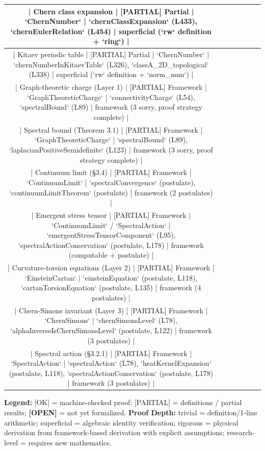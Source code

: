 \documentclass[11pt,a4paper]{article}
\theoremstyle{plain}
\theoremstyle{definition}
\begin{document}
\begin{table}[h]
\begin{tabular}{|c|c|c|c|c|c|c|}
| Chern class expansion | [PARTIAL] Partial | `ChernNumber` | `chernClassExpansion` (L433), `chernEulerRelation` (L454) | superficial (`rw` definition + `ring`) | \\ \hline
| Kitaev periodic table | [PARTIAL] Partial | `ChernNumber` | `chernNumberInKitaevTable` (L326), `classA_2D_topological` (L338) | superficial (`rw` definition + `norm_num`) | \\ \hline
| Graph-theoretic charge (Layer 1) | [PARTIAL] Framework | `GraphTheoreticCharge` | `connectivityCharge` (L54), `spectralBound` (L89) | framework (3 sorry, proof strategy complete) | \\ \hline
| Spectral bound (Theorem 3.1) | [PARTIAL] Framework | `GraphTheoreticCharge` | `spectralBound` (L89), `laplacianPositiveSemidefinite` (L123) | framework (3 sorry, proof strategy complete) | \\ \hline
| Continuum limit (§3.4) | [PARTIAL] Framework | `ContinuumLimit` | `spectralConvergence` (postulate), `continuumLimitTheorem` (postulate) | framework (2 postulates) | \\ \hline
| Emergent stress tensor | [PARTIAL] Framework | `ContinuumLimit` / `SpectralAction` | `emergentStressTensorComponent` (L95), `spectralActionConservation` (postulate, L178) | framework (computable + postulate) | \\ \hline
| Curvature-torsion equations (Layer 2) | [PARTIAL] Framework | `EinsteinCartan` | `einsteinEquation` (postulate, L118), `cartanTorsionEquation` (postulate, L135) | framework (4 postulates) | \\ \hline
| Chern-Simons invariant (Layer 3) | [PARTIAL] Framework | `ChernSimons` | `chernSimonsLevel` (L78), `alphaInverseIsChernSimonsLevel` (postulate, L122) | framework (3 postulates) | \\ \hline
| Spectral action (§3.2.1) | [PARTIAL] Framework | `SpectralAction` | `spectralAction` (L78), `heatKernelExpansion` (postulate, L118), `spectralActionConservation` (postulate, L178) | framework (3 postulates) | \\ \hline
\end{tabular}
\end{table}

\textbf{Legend:} [OK] = machine-checked proof; [PARTIAL] = definitions / partial results; \textbf{[OPEN]} = not yet formalized.
\textbf{Proof Depth:} trivial = definition/1-line arithmetic; superficial = algebraic identity verification; rigorous = physical derivation from framework-based derivation with explicit assumptions; research-level = requires new mathematics.
\end{document}
